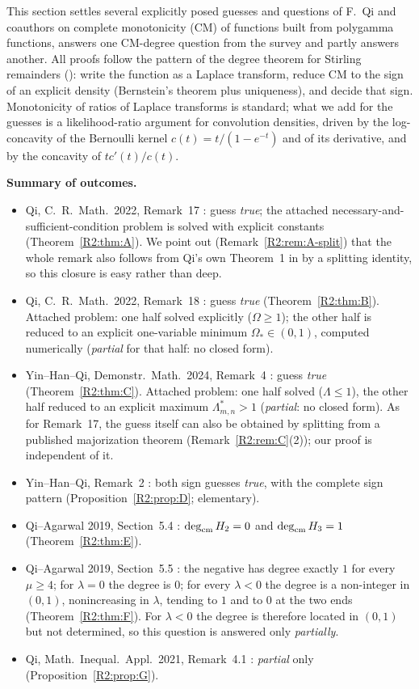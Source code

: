 \documentclass[11pt]{amsart}
\theoremstyle{definition}
\theoremstyle{remark}
\begin{document}
This section settles several explicitly posed guesses and questions of
F.~Qi and coauthors on complete monotonicity (CM) of functions built from
polygamma functions, answers one CM-degree question from the survey
\cite{R2-QiAgarwal2019} and partly answers another. All proofs follow the pattern of the degree
theorem for Stirling remainders (\cite[Part~VIII]{K-033}): write the
function as a Laplace transform, reduce CM to the sign of an explicit density
(Bernstein's theorem plus uniqueness), and decide that sign. Monotonicity of
ratios of Laplace transforms is standard; what we add for the guesses is a
likelihood-ratio argument for convolution densities, driven by the
log-concavity of the Bernoulli kernel $c(t)=t/(1-e^{-t})$ and of its
derivative, and by the concavity of $tc'(t)/c(t)$.

\medskip\noindent\textbf{Summary of outcomes.}
\begin{itemize}
\item Qi, C.~R.~Math.\ 2022, Remark~17 \cite{R2-QiCR2022}: guess \emph{true};
 the attached necessary-and-sufficient-condition problem is solved with
 explicit constants (Theorem~\ref{R2:thm:A}). We point out
 (Remark~\ref{R2:rem:A-split}) that the whole remark also follows from Qi's own
 Theorem~1 in \cite{R2-QiCR2022} by a splitting identity, so this closure is
 easy rather than deep.
\item Qi, C.~R.~Math.\ 2022, Remark~18 \cite{R2-QiCR2022}: guess \emph{true}
 (Theorem~\ref{R2:thm:B}). Attached problem: one half solved explicitly
 ($\Omega\ge1$); the other half is reduced to an explicit one-variable
 minimum $\Omega_*\in(0,1)$, computed numerically (\emph{partial} for that
 half: no closed form).
\item Yin--Han--Qi, Demonstr.\ Math.\ 2024, Remark~4 \cite{R2-YHQ2024}:
 guess \emph{true} (Theorem~\ref{R2:thm:C}). Attached problem: one half
 solved ($\Lambda\le1$), the other half reduced to an explicit maximum
 $\Lambda^*_{m,n}>1$ (\emph{partial}: no closed form). As for Remark~17, the
 guess itself can also be obtained by splitting from a published majorization
 theorem (Remark~\ref{R2:rem:C}(2)); our proof is independent of it.
\item Yin--Han--Qi, Remark~2 \cite{R2-YHQ2024}: both sign guesses
 \emph{true}, with the complete sign pattern (Proposition~\ref{R2:prop:D};
 elementary).
\item Qi--Agarwal 2019, Section~5.4 \cite{R2-QiAgarwal2019}:
 $\operatorname{deg}_{\mathrm{cm}} H_2=0$ and $\operatorname{deg}_{\mathrm{cm}} H_3=1$ (Theorem~\ref{R2:thm:E}).
\item Qi--Agarwal 2019, Section~5.5 \cite{R2-QiAgarwal2019}: the negative
 has degree exactly $1$ for every $\mu\ge4$; for $\lambda=0$ the degree is
 $0$; for every $\lambda<0$ the degree is a non-integer in $(0,1)$,
 nonincreasing in $\lambda$, tending to $1$ and to $0$ at the two ends
 (Theorem~\ref{R2:thm:F}). For $\lambda<0$ the degree is therefore
 located in $(0,1)$ but not determined, so this question is answered only
 \emph{partially}.
\item Qi, Math.\ Inequal.\ Appl.\ 2021, Remark~4.1 \cite{R2-QiMIA2021}:
 \emph{partial} only (Proposition~\ref{R2:prop:G}).
\end{itemize}
\end{document}

